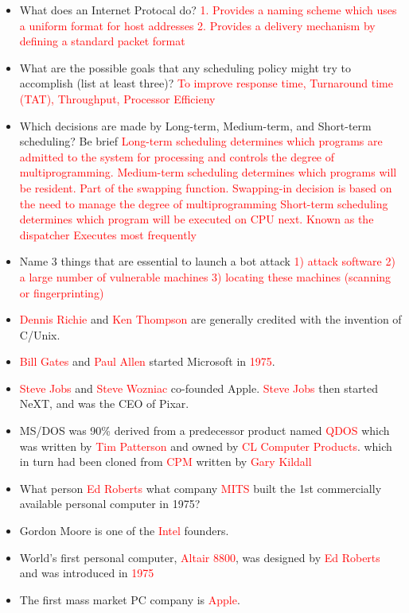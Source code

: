 \documentclass[9pt,landscape]{memoir}
\newcommand{\answer}[1]{\textcolor{red}{#1}}
\begin{document}
\begin{multicols}{6}
\begin{itemize}
    \item What does an Internet Protocal do?  \answer{1. Provides a naming scheme which uses a uniform format for host addresses 2. Provides a delivery mechanism by defining a standard packet format}
    \item What are the possible goals that any scheduling policy might try to accomplish (list at least three)?  \answer{To improve response time, Turnaround time (TAT), Throughput, Processor Efficieny}
    \item Which decisions are made by Long-term, Medium-term, and Short-term scheduling? Be brief \answer{Long-term scheduling determines which programs are admitted to the system for processing and controls the degree of multiprogramming. Medium-term scheduling determines which programs will be resident. Part of the swapping function. Swapping-in decision is based on the need to manage the degree of multiprogramming Short-term scheduling determines which program will be executed on CPU next. Known as the dispatcher Executes most frequently}
    \item Name 3 things that are essential to launch a bot attack \answer{1) attack software 2) a large number of vulnerable machines 3) locating these machines (scanning or fingerprinting)}
    \item \answer{Dennis Richie} and \answer{Ken Thompson} are generally credited with the invention of C/Unix.
    \item \answer{Bill Gates} and \answer{Paul Allen} started Microsoft in \answer{1975}.
    \item \answer{Steve Jobs} and \answer{Steve Wozniac} co-founded Apple. \answer{Steve Jobs} then started NeXT, and was the CEO of Pixar.
    \item MS/DOS was 90\% derived from a predecessor product named \answer{QDOS} which was written by \answer{Tim Patterson} and owned by \answer{CL Computer Products}. which in turn had been cloned from \answer{CPM} written by \answer{Gary Kildall}
    \item What person \answer{Ed Roberts} what company \answer{MITS} built the 1st commercially available personal computer in 1975?
    \item Gordon Moore is one of the \answer{Intel} founders.
    \item World's first personal computer, \answer{Altair 8800}, was designed by \answer{Ed Roberts} and was introduced in \answer{1975}
    \item The first mass market PC company is \answer{Apple}.

\end{itemize}
\end{multicols}
\end{document}
